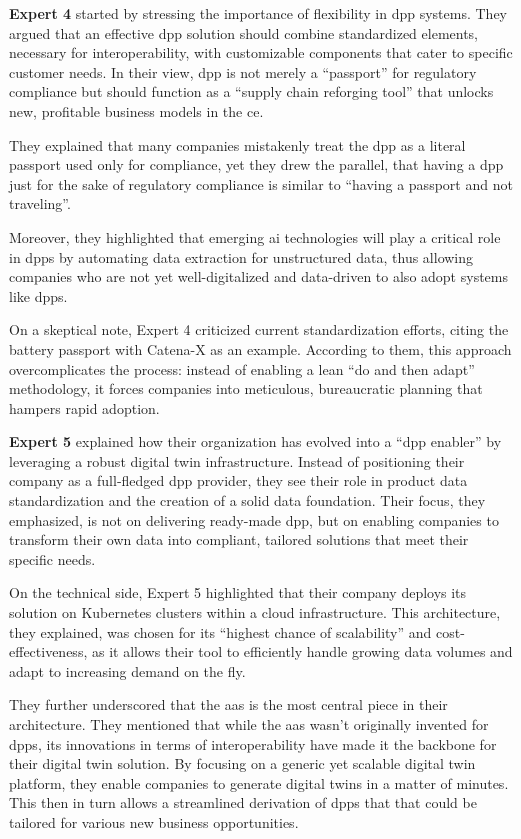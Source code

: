\textbf{Expert 4} started by stressing the importance of flexibility in \ac{dpp} systems. They argued that an effective \ac{dpp} solution should combine standardized elements, necessary for interoperability, with customizable components that cater to specific customer needs. In their view, \ac{dpp} is not merely a ``passport'' for regulatory compliance but should function as a ``supply chain reforging tool'' that unlocks new, profitable business models in the \acrlong{ce}.

They explained that many companies mistakenly treat the \ac{dpp} as a literal passport used only for compliance, yet they drew the parallel, that having a \ac{dpp} just for the sake of regulatory compliance is similar to ``having a passport and not traveling''.

Moreover, they highlighted that emerging \ac{ai} technologies will play a critical role in \ac{dpp}s by automating data extraction for unstructured data, thus allowing companies who are not yet well-digitalized and data-driven to also adopt systems like \ac{dpp}s.

On a skeptical note, Expert 4 criticized current standardization efforts, citing the battery passport with Catena-X as an example. According to them, this approach overcomplicates the process: instead of enabling a lean ``do and then adapt'' methodology, it forces companies into meticulous, bureaucratic planning that hampers rapid adoption.

\textbf{Expert 5} explained how their organization has evolved into a ``\ac{dpp} enabler'' by leveraging a robust digital twin infrastructure. Instead of positioning their company as a full‐fledged \ac{dpp} provider, they see their role in product data standardization and the creation of a solid data foundation. Their focus, they emphasized, is not on delivering ready-made \ac{dpp}, but on enabling companies to transform their own data into compliant, tailored solutions that meet their specific needs.

On the technical side, Expert 5 highlighted that their company deploys its solution on Kubernetes clusters within a cloud infrastructure. This architecture, they explained, was chosen for its ``highest chance of scalability'' and cost-effectiveness, as it allows their tool to efficiently handle growing data volumes and adapt to increasing demand on the fly.

They further underscored that the  \acrlong{aas} is the most central piece in their architecture. They mentioned that while the \ac{aas} wasn't originally invented for \ac{dpp}s, its innovations in terms of interoperability have made it the backbone for their digital twin solution. By focusing on a generic yet scalable digital twin platform, they enable companies to generate digital twins in a matter of minutes. This then in turn allows a streamlined derivation of \ac{dpp}s that that could be tailored for various new business opportunities.

